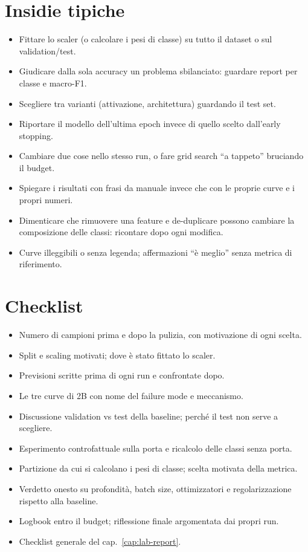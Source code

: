 \section{Insidie tipiche}
\begin{attenzione}
\begin{itemize}
  \item Fittare lo scaler (o calcolare i pesi di classe) su tutto il dataset o sul validation/test.
  \item Giudicare dalla sola accuracy un problema sbilanciato: guardare report per classe e macro-F1.
  \item Scegliere tra varianti (attivazione, architettura) guardando il test set.
  \item Riportare il modello dell'ultima epoch invece di quello scelto dall'early stopping.
  \item Cambiare due cose nello stesso run, o fare grid search ``a tappeto'' bruciando il budget.
  \item Spiegare i risultati con frasi da manuale invece che con le proprie curve e i propri numeri.
  \item Dimenticare che rimuovere una feature e de-duplicare possono cambiare la composizione delle
        classi: ricontare dopo ogni modifica.
  \item Curve illeggibili o senza legenda; affermazioni ``è meglio'' senza metrica di riferimento.
\end{itemize}
\end{attenzione}

\section{Checklist}
\begin{itemize}
  \item[$\square$] Numero di campioni prima e dopo la pulizia, con motivazione di ogni scelta.
  \item[$\square$] Split e scaling motivati; dove è stato fittato lo scaler.
  \item[$\square$] Previsioni scritte prima di ogni run e confrontate dopo.
  \item[$\square$] Le tre curve di 2B con nome del failure mode e meccanismo.
  \item[$\square$] Discussione validation vs test della baseline; perché il test non serve a scegliere.
  \item[$\square$] Esperimento controfattuale sulla porta e ricalcolo delle classi senza porta.
  \item[$\square$] Partizione da cui si calcolano i pesi di classe; scelta motivata della metrica.
  \item[$\square$] Verdetto onesto su profondità, batch size, ottimizzatori e regolarizzazione rispetto
        alla baseline.
  \item[$\square$] Logbook entro il budget; riflessione finale argomentata dai propri run.
  \item[$\square$] Checklist generale del cap.~\ref{cap:lab-report}.
\end{itemize}
